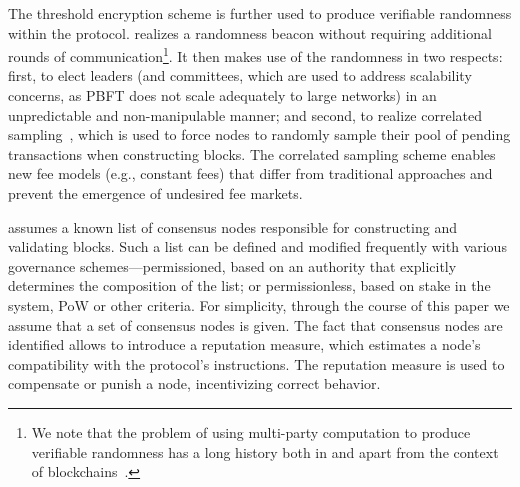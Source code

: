 The threshold encryption scheme is further used to produce verifiable randomness within the protocol. \name realizes a randomness beacon without requiring additional rounds of communication\footnote{We note that the problem of using multi-party computation to produce verifiable randomness has a long history both in and apart from the context of blockchains~\cite{SCRAP,AlgorandV9,Dfinity}.}. It then makes use of the randomness in two respects: first, to elect leaders (and committees, which are used to address scalability concerns, as PBFT does not scale adequately to large networks) in an unpredictable and non-manipulable manner; and second, to realize correlated sampling~\cite{HashSample1}, which is used to force nodes to randomly sample their pool of pending transactions when constructing blocks. The correlated sampling scheme enables new fee models (e.g., constant fees) that differ from traditional approaches and prevent the emergence of undesired fee markets.



\name assumes a known list of consensus nodes responsible for constructing and validating blocks. Such a list can be defined and modified frequently with various governance schemes---permissioned, based on an authority that explicitly determines the composition of the list; or permissionless, based on stake in the system, PoW or other criteria. For simplicity, through the course of this paper we assume that a set of consensus nodes is given. 
The fact that consensus nodes are identified allows \name to introduce a reputation measure, which estimates a node's compatibility with the protocol's instructions. The reputation measure is used to compensate or punish a node, incentivizing correct behavior. %

